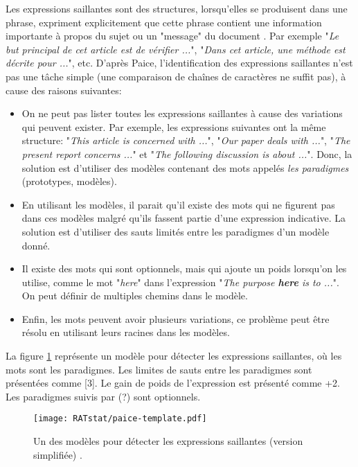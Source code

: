 \documentclass[a4paper,12pt,oneside]{../use/ESIthesis}
\begin{document}
Les expressions saillantes sont des structures, lorsqu'elles se produisent dans une phrase, expriment explicitement que cette phrase contient une information importante à propos du sujet ou un "message" du document \cite{81-paice}. 
Par exemple "\textit{Le but principal de cet article est de vérifier ...}", "\textit{Dans cet article, une méthode est décrite pour ...}", etc.
D'après Paice, l'identification des expressions saillantes n'est pas une tâche simple (une comparaison de chaînes de caractères ne suffit pas), à cause des raisons suivantes:
\begin{itemize}
\item On ne peut pas lister toutes les expressions saillantes à cause des variations qui peuvent exister. 
Par exemple, les expressions suivantes ont la même structure: "\textit{This article is concerned with ...}", "\textit{Our paper deals with ...}", "\textit{The present report concerns ...}" et "\textit{The following discussion is about ...}". 
Donc, la solution est d'utiliser des modèles contenant des mots appelés \textit{les paradigmes} (prototypes, modèles). 

\item En utilisant les modèles, il parait qu'il existe des mots qui ne figurent pas dans ces modèles malgré qu'ils fassent partie d'une expression indicative. 
La solution est d'utiliser des sauts limités entre les paradigmes d'un modèle donné.

\item Il existe des mots qui sont optionnels, mais qui ajoute un poids lorsqu'on les utilise, comme le mot "\textit{here}" dans l'expression "\textit{The purpose \textbf{here} is to ...}". 
On peut définir de multiples chemins dans le modèle. 

\item Enfin, les mots peuvent avoir plusieurs variations, ce problème peut être résolu en utilisant leurs racines dans les modèles. 
\end{itemize}
La figure \ref{fig:paice-template} représente un modèle pour détecter les expressions saillantes, où les mots sont les paradigmes. 
Les limites de sauts entre les paradigmes sont présentées comme [3]. 
Le gain de poids de l'expression est présenté comme +2. 
Les paradigmes suivis par (?) sont optionnels.
%
\begin{figure}[ht]
\begin{center}
\texttt{[image: RATstat/paice-template.pdf]} %
 \caption[Un des modèles pour détecter les expressions saillantes] %
 {Un des modèles pour détecter les expressions saillantes (version simplifiée) \cite{81-paice}.}
 \label{fig:paice-template}
\end{center}
\end{figure}
\end{document}
